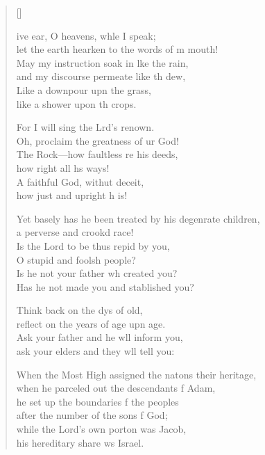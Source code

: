 \settowidth{\versewidth}{Yet basely has he been treated by his degenerate children, *}
\begin{verse}[\versewidth]%
  \begin{patverse}
ive ear, O heavens, wh\pointup{\i}le I speak;\Med\\
let the earth hearken to the words of m mouth!\\
May my instruction soak in l\pointup{\i}ke the rain,\Med\\
and my discourse permeate like th dew,\\
Like a downpour upn the grass,\Med\\
like a shower upon th crops.

For I will sing the Lrd’s renown.\Med\\
Oh, proclaim the greatness of ur God!\\
The Rock---how faultless re his deeds,\Med\\
how right all h\pointup{\i}s ways!\\
A faithful God, withut deceit,\Med\\
how just and upright h is!

Yet basely has he been treated by his degenrate children,\Med\\
a perverse and crookd race!\\
Is the Lord to be thus repid by you,\Med\\
O stupid and fool\pointup{\i}sh people?\\
Is he not your father wh created you?\Med\\
Has he not made you and stablished you?

Think back on the dys of old,\Med\\
reflect on the years of age upn age.\\
Ask your father and he w\pointup{\i}ll inform you,\Med\\
ask your elders and they w\pointup{\i}ll tell you:

When the Most High assigned the nat\pointup{\i}ons their heritage,\Med\\
when he parceled out the descendants f Adam,\\
he set up the boundaries f the peoples\Med\\
after the number of the sons f God;\\
while the Lord’s own port\pointup{\i}on was Jacob,\Med\\
his hereditary share ws Israel.


\end{patverse}
\end{verse}
